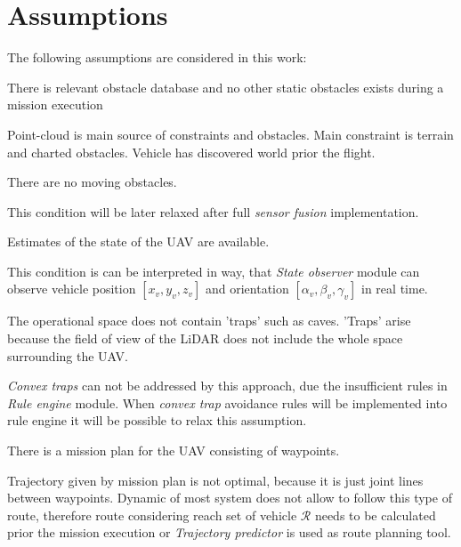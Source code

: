 \section{Assumptions}
\noindent
The following assumptions are considered in this work:
\begin{assumption}{There is relevant obstacle database and no other static obstacles exists during a mission execution}\label{ass:1}\end{assumption}
\noindent Point-cloud is main source of constraints and obstacles. Main constraint is terrain and charted obstacles. Vehicle has discovered world prior the flight.  

\begin{assumption}{There are no moving obstacles.}\label{ass:3}\end{assumption}
\noindent This condition will be later relaxed after full \textit{sensor fusion} implementation.

\begin{assumption}{Estimates of the state of the UAV are available.}\label{ass:4}\end{assumption}
\noindent This condition is can be interpreted in way, that \textit{State observer} module can observe vehicle position $[x_v,y_v,z_v]$ and orientation $[\alpha_v,\beta_v,\gamma_v]$ in real time. 

\begin{assumption}{The operational space does not contain 'traps' such as caves. 'Traps' arise because the field of view of the LiDAR does not include the whole space surrounding the UAV.}\label{ass:5}\end{assumption}
\noindent \textit{Convex traps} can not be addressed by this approach, due the insufficient rules in \textit{Rule engine} module. When \textit{convex trap} avoidance rules will be implemented into rule engine it will be possible to relax this assumption.

\begin{assumption}{There is a mission plan for the UAV consisting of waypoints.} \label{ass:6} \end{assumption}

\noindent Trajectory given by mission plan is not optimal, because it is just joint lines between waypoints. Dynamic of most system does not allow to follow this type of route, therefore route considering reach set of vehicle $\mathscr{R}$ needs to be calculated prior the mission execution or \textit{Trajectory predictor} is used as route planning tool. 